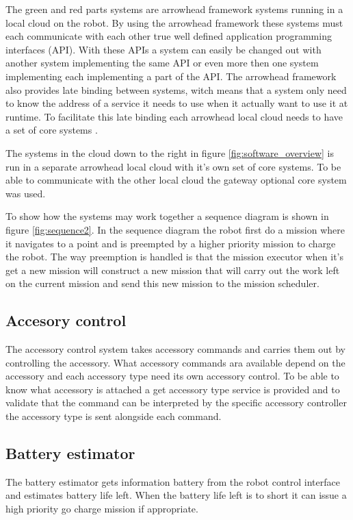 \documentclass{article}
\begin{document}
The green and red parts systems are arrowhead framework systems \cite{delsing2017arrowhead} running in a local cloud on the robot. By using the arrowhead framework these systems must each communicate with each other true well defined application programming interfaces (API). With these APIs a system can easily be changed out with another system implementing the same API or even more then one system implementing each implementing a part of the API.
The arrowhead framework also provides late binding between systems, witch means that a system only need to know the address of a service it needs to use when it actually want to use it at runtime.
To facilitate this late binding each arrowhead local cloud needs to have a set of core systems \cite{varga2017making}.

The systems in the cloud down to the right in figure \ref{fig:software_overview} is run in a separate arrowhead local cloud with it's own set of core systems. To be able to communicate with the other local cloud the gateway optional core system \cite{varga2015service} was used.



To show how the systems may work together a sequence diagram is shown in figure \ref{fig:sequence2}.
In the sequence diagram the robot first do a mission where it navigates to a point and is preempted by a higher priority mission to charge the robot.
The way preemption is handled is that the mission executor when it's get a new mission will construct a new mission that will carry out the work left on the current mission and send this new mission to the mission scheduler.

\subsection{Accesory control}
\label{sec:software:first}
The accessory control system takes accessory commands and carries them out by controlling the accessory.
What accessory commands ara available depend on the accessory and each accessory type need its own accessory control.
To be able to know what accessory is attached a get accessory type service is provided and to validate that the command can be interpreted by the specific accessory controller the accessory type is sent alongside each command.

\subsection{Battery estimator}
The battery estimator gets information battery from the robot control interface and estimates battery life left.
When the battery life left is to short it can issue a high priority go charge mission if appropriate.
\end{document}
